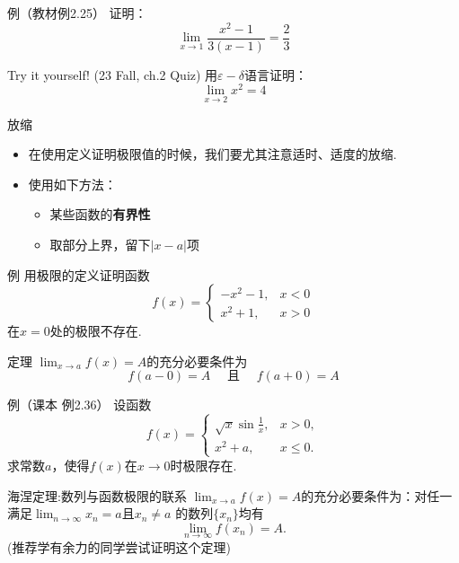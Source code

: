 \documentclass[]{beamer}
\begin{document}
\begin{frame}{例（教材例2.25）}
    证明：
    \[
    \lim_{x\rightarrow 1}\frac{x^2-1}{3(x-1)}=\frac23
    \]
\end{frame}

\begin{frame}{Try it yourself! (23 Fall, ch.2 Quiz)}
    用$\varepsilon-\delta$语言证明：
    \[
    \lim_{x\rightarrow2}x^2=4
    \]
\end{frame}

\begin{frame}{放缩}
    \begin{itemize}
        \item 在使用定义证明极限值的时候，我们要尤其注意适时、适度的放缩.
        \item 使用如下方法：
        \begin{itemize}
            \item 某些函数的\textbf{有界性}
            \item 取部分上界，留下$|x-a|$项
        \end{itemize}
    \end{itemize}
\end{frame}

\begin{frame}{例}
    用极限的定义证明函数
    \[
    f(x)=\left\{
    \begin{array}{ll}
        -x^2-1,&x<0\\
        x^2+1,&x>0
    \end{array}
    \right.
    \]
    在$x=0$处的极限不存在.
\end{frame}

\begin{frame}{定理}
    $\displaystyle\lim_{x\rightarrow a}f(x)=A$的充分必要条件为
    \[
    f(a-0)=A\quad\text{ 且 }\quad f(a+0)=A
    \]
\end{frame}

\begin{frame}{例（课本 例2.36）}
    设函数
    \[
    f(x)=\left\{
        \begin{array}{ll}
            \sqrt x\sin\frac1x,&x>0,\\
            x^2+a,&x\le 0.
        \end{array}
    \right.
    \]
    求常数$a$，使得$f(x)$在$x\rightarrow0$时极限存在.
\end{frame}

\begin{frame}{海涅定理:数列与函数极限的联系}
    $\displaystyle\lim_{x\rightarrow a}f(x)=A$的充分必要条件为：对任一满足$\displaystyle\lim_{n\rightarrow\infty}x_n=a$且$x_n\ne a$
    的数列$\{x_n\}$均有\[
    \lim_{n\rightarrow\infty}f(x_n)=A.
    \]
    (推荐学有余力的同学尝试证明这个定理)
\end{frame}
\end{document}
